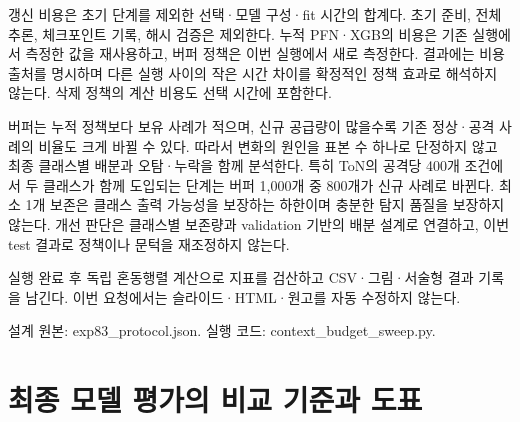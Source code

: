 갱신 비용은 초기 단계를 제외한 선택·모델 구성·fit 시간의 합계다. 초기 준비, 전체 추론, 체크포인트 기록, 해시 검증은 제외한다. 누적 PFN·XGB의 비용은 기존 실행에서 측정한 값을 재사용하고, 버퍼 정책은 이번 실행에서 새로 측정한다. 결과에는 비용 출처를 명시하며 다른 실행 사이의 작은 시간 차이를 확정적인 정책 효과로 해석하지 않는다. 삭제 정책의 계산 비용도 선택 시간에 포함한다.

버퍼는 누적 정책보다 보유 사례가 적으며, 신규 공급량이 많을수록 기존 정상·공격 사례의 비율도 크게 바뀔 수 있다. 따라서 변화의 원인을 표본 수 하나로 단정하지 않고 최종 클래스별 배분과 오탐·누락을 함께 분석한다. 특히 ToN의 공격당 400개 조건에서 두 클래스가 함께 도입되는 단계는 버퍼 1,000개 중 800개가 신규 사례로 바뀐다. 최소 1개 보존은 클래스 출력 가능성을 보장하는 하한이며 충분한 탐지 품질을 보장하지 않는다. 개선 판단은 클래스별 보존량과 validation 기반의 배분 설계로 연결하고, 이번 test 결과로 정책이나 문턱을 재조정하지 않는다.

실행 완료 후 독립 혼동행렬 계산으로 지표를 검산하고 CSV·그림·서술형 결과 기록을 남긴다. 이번 요청에서는 슬라이드·HTML·원고를 자동 수정하지 않는다.

설계 원본: exp83\_\allowbreak{}protocol.json. 실행 코드: context\_\allowbreak{}budget\_\allowbreak{}sweep.py.



\section{최종 모델 평가의 비교 기준과 도표}
